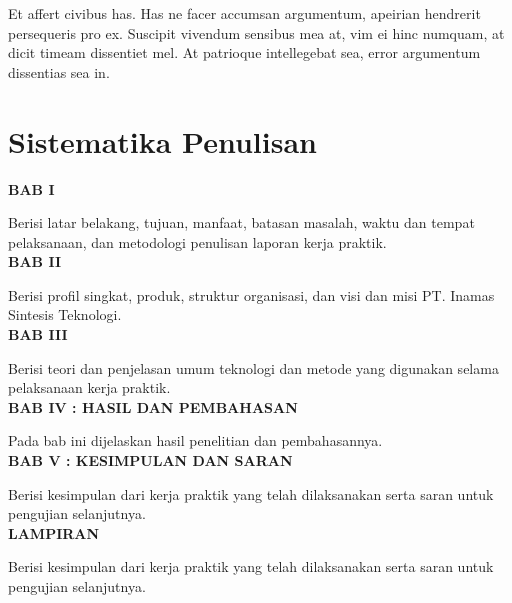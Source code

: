 Et affert civibus has. Has ne facer accumsan argumentum, apeirian hendrerit persequeris pro ex. Suscipit vivendum sensibus mea at, vim ei hinc numquam, at dicit timeam dissentiet mel. At patrioque intellegebat sea, error argumentum dissentias sea in.


\section{Sistematika Penulisan}
\noindent
\textbf{BAB I}

Berisi latar belakang, tujuan, manfaat, batasan masalah, waktu dan tempat pelaksanaan, dan metodologi penulisan laporan kerja praktik.\\

\noindent
\textbf{BAB II}

Berisi profil singkat, produk, struktur organisasi, dan visi dan misi PT. Inamas Sintesis Teknologi.\\

\noindent
\textbf{BAB III}

Berisi teori dan penjelasan umum teknologi dan metode yang digunakan selama pelaksanaan kerja praktik.\\

\noindent
\textbf{BAB IV : HASIL DAN PEMBAHASAN}

Pada bab ini dijelaskan hasil penelitian dan pembahasannya.\\

\noindent
\textbf{BAB V : KESIMPULAN DAN SARAN}

Berisi kesimpulan dari kerja praktik yang telah dilaksanakan serta saran untuk pengujian selanjutnya.\\

\noindent
\textbf{LAMPIRAN}

Berisi kesimpulan dari kerja praktik yang telah dilaksanakan serta saran untuk pengujian selanjutnya.\\

\begin{comment}

\end{comment}

